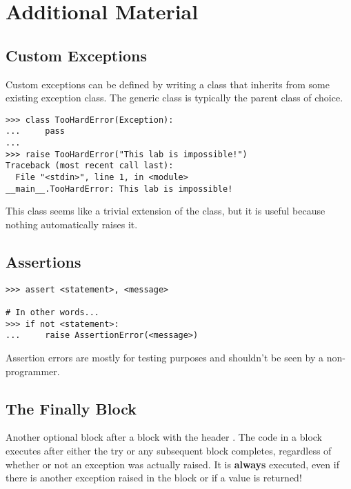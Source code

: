 \newpage

\section*{Additional Material} %

\subsection*{Custom Exceptions}

Custom exceptions can be defined by writing a class that inherits from some existing exception class.
The generic  class is typically the parent class of choice.

\begin{lstlisting}
>>> class TooHardError(Exception):
...     pass
... 
>>> raise TooHardError("This lab is impossible!")
Traceback (most recent call last):
  File "<stdin>", line 1, in <module>
__main__.TooHardError: This lab is impossible!
\end{lstlisting}

This class seems like a trivial extension of the  class, but it is useful because nothing automatically raises it.

\subsection*{Assertions} %

\begin{lstlisting}
>>> assert <statement>, <message>

# In other words...
>>> if not <statement>:
...     raise AssertionError(<message>)
\end{lstlisting}

Assertion errors are mostly for testing purposes and shouldn't be seen by a non-programmer.

\subsection*{The Finally Block} %
Another optional block after a  block with the header .
The code in a  block executes after either the try or any subsequent block completes, regardless of whether or not an exception was actually raised.
It is \textbf{always} executed, even if there is another exception raised in the  block or if a value is returned!

